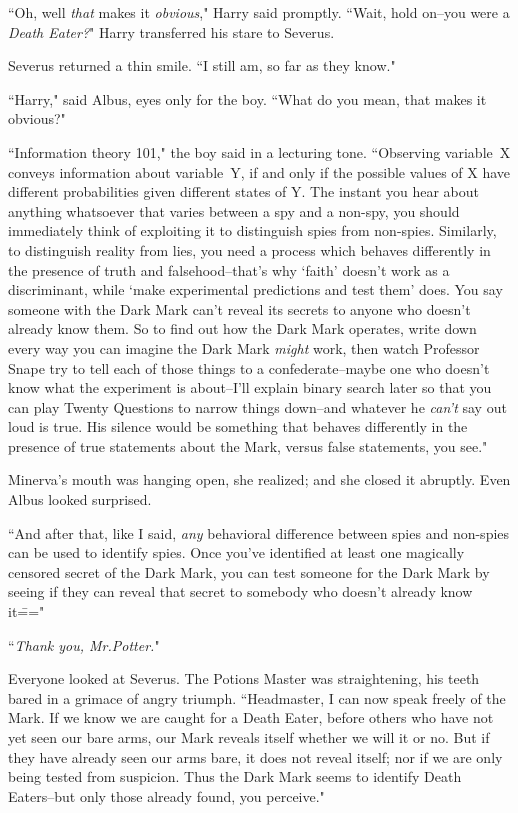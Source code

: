 ``Oh, well \emph{that} makes it \emph{obvious}," Harry said promptly. ``Wait, hold on\---you were a \emph{Death Eater?}" Harry transferred his stare to Severus.

Severus returned a thin smile. ``I still am, so far as they know."

``Harry," said Albus, eyes only for the boy. ``What do you mean, that makes it obvious?"

``Information theory 101," the boy said in a lecturing tone. ``Observing variable~X conveys information about variable~Y, if and only if the possible values of X have different probabilities given different states of Y\@. The instant you hear about anything whatsoever that varies between a spy and a non-spy, you should immediately think of exploiting it to distinguish spies from non-spies. Similarly, to distinguish reality from lies, you need a process which behaves differently in the presence of truth and falsehood\---that's why `faith' doesn't work as a discriminant, while `make experimental predictions and test them' does. You say someone with the Dark Mark can't reveal its secrets to anyone who doesn't already know them. So to find out how the Dark Mark operates, write down every way you can imagine the Dark Mark \emph{might} work, then watch Professor Snape try to tell each of those things to a confederate\---maybe one who doesn't know what the experiment is about\---I'll explain binary search later so that you can play Twenty Questions to narrow things down\---and whatever he \emph{can't} say out loud is true. His silence would be something that behaves differently in the presence of true statements about the Mark, versus false statements, you see."

Minerva's mouth was hanging open, she realized; and she closed it abruptly. Even Albus looked surprised.

``And after that, like I said, \emph{any} behavioral difference between spies and non-spies can be used to identify spies. Once you've identified at least one magically censored secret of the Dark Mark, you can test someone for the Dark Mark by seeing if they can reveal that secret to somebody who doesn't already know it\==="

``\emph{Thank you, Mr.\?Potter.}"

Everyone looked at Severus. The Potions Master was straightening, his teeth bared in a grimace of angry triumph. ``Headmaster, I can now speak freely of the Mark. If we know we are caught for a Death Eater, before others who have not yet seen our bare arms, our Mark reveals itself whether we will it or no. But if they have already seen our arms bare, it does not reveal itself; nor if we are only being tested from suspicion. Thus the Dark Mark seems to identify Death Eaters\---but only those already found, you perceive."

